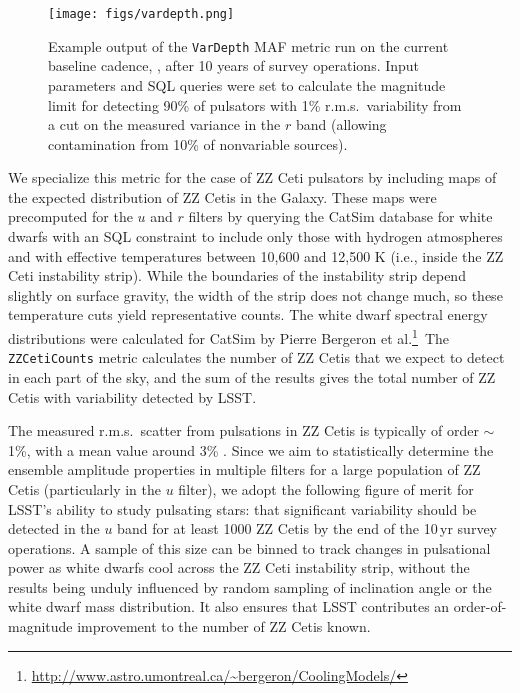 \begin{figure}
  \centering
  \texttt{[image: figs/vardepth.png]}
  \caption{Example output of the {\tt VarDepth} MAF metric run on the
  current baseline cadence, , after 10 years of survey
  operations. Input parameters and SQL queries were set to calculate the
  magnitude limit for detecting 90\% of pulsators with 1\% r.m.s.\
  variability from a cut on the measured variance in the $r$ band
  (allowing contamination from 10\% of nonvariable sources).}
  \label{fig:vardepth}
\end{figure}


We specialize this metric for the case of ZZ Ceti pulsators by including
maps of the expected distribution of ZZ Cetis in the Galaxy. These maps
were precomputed for the $u$ and $r$ filters by querying the CatSim
database for white dwarfs with an SQL constraint to include only those
with hydrogen atmospheres and with effective temperatures between 10,600
and 12,500 K (i.e., inside the ZZ Ceti instability strip).  While the
boundaries of the instability strip depend slightly on surface gravity,
the width of the strip does not change much, so these temperature cuts
yield representative counts.  The white dwarf spectral energy
distributions were calculated for CatSim by Pierre Bergeron et
al.\footnote{\url{http://www.astro.umontreal.ca/~bergeron/CoolingModels/}}\
The {\tt ZZCetiCounts} metric calculates the number of ZZ Cetis that we
expect to detect in each part of the sky, and the sum of the results
gives the total number of ZZ Cetis with variability detected by LSST.

The measured r.m.s.\ scatter from pulsations in ZZ Cetis is typically of
order $\sim$1\%, with a mean value around 3\%
\citep{2006ApJ...640..956M}.  Since we aim to statistically determine
the ensemble amplitude properties in multiple filters for a large
population of ZZ Cetis (particularly in the $u$ filter), we adopt the
following figure of merit for LSST's ability to study pulsating stars:
that significant variability should be detected in the $u$ band for at
least 1000 ZZ Cetis by the end of
the 10\,yr survey operations.  A sample of this size can be binned to track
changes in pulsational power as white dwarfs cool across the ZZ Ceti
instability strip, without the results being unduly influenced by random
sampling of inclination angle or the white dwarf mass distribution. It also
ensures that LSST contributes an order-of-magnitude improvement to the
number of ZZ Cetis known.

